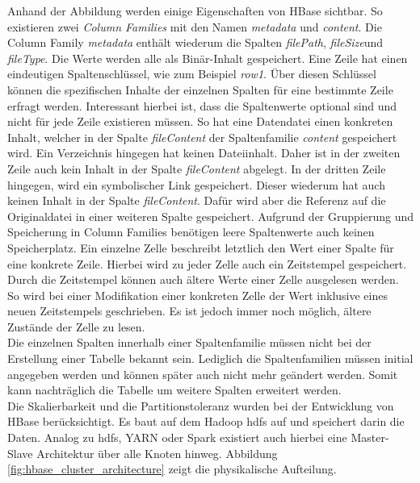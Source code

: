 \noindent
Anhand der Abbildung werden einige Eigenschaften von HBase sichtbar. So existieren zwei \textit{Column Families} mit den Namen \textit{metadata} und \textit{content}. Die Column Family \textit{metadata} enthält wiederum die Spalten \textit{filePath}, \textit{fileSize}und \textit{fileType}. Die Werte werden alle als Binär-Inhalt gespeichert. Eine Zeile hat einen eindeutigen Spaltenschlüssel, wie zum Beispiel \textit{row1}. 
Über diesen Schlüssel können die spezifischen Inhalte der einzelnen Spalten für eine bestimmte Zeile erfragt werden. Interessant hierbei ist, dass die Spaltenwerte optional sind und nicht für jede Zeile existieren müssen. So hat eine Datendatei einen konkreten Inhalt, welcher in der Spalte \textit{fileContent} der Spaltenfamilie \textit{content} gespeichert wird. Ein Verzeichnis hingegen hat keinen Dateiinhalt. 
Daher ist in der zweiten Zeile auch kein Inhalt in der Spalte \textit{fileContent} abgelegt. In der dritten Zeile hingegen, wird ein symbolischer Link gespeichert. Dieser wiederum hat auch keinen Inhalt in der Spalte \textit{fileContent}. Dafür wird aber die Referenz auf die Originaldatei in einer weiteren Spalte gespeichert. Aufgrund der Gruppierung und Speicherung in Column Families benötigen leere Spaltenwerte auch keinen Speicherplatz. 
Ein einzelne Zelle beschreibt letztlich den Wert einer Spalte für eine konkrete Zeile. Hierbei wird zu jeder Zelle auch ein Zeitstempel gespeichert. Durch die Zeitstempel können auch ältere Werte einer Zelle ausgelesen werden. 
So wird bei einer Modifikation einer konkreten Zelle der Wert inklusive eines neuen Zeitstempels geschrieben. Es ist jedoch immer noch möglich, ältere Zustände der Zelle zu lesen.\\
Die einzelnen Spalten innerhalb einer Spaltenfamilie müssen nicht bei der Erstellung einer Tabelle bekannt sein. Lediglich die Spaltenfamilien müssen initial angegeben werden und können später auch nicht mehr geändert werden. Somit kann nachträglich die Tabelle um weitere Spalten erweitert werden.\cite[S. 577]{hadoop_definitive_guide}\\

\noindent
Die Skalierbarkeit und die Partitionstoleranz wurden bei der Entwicklung von HBase berücksichtigt. Es baut auf dem Hadoop \gls{hdfs} auf und speichert darin die Daten. Analog zu \gls{hdfs}, YARN oder Spark existiert auch hierbei eine Master-Slave Architektur über alle Knoten hinweg. Abbildung \ref{fig:hbase_cluster_architecture} zeigt die physikalische Aufteilung.\\

